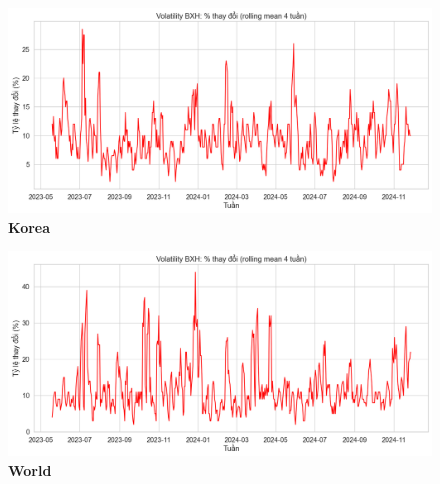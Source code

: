 \begin{itemize}
\begin{figure}[H]
        \begin{minipage}{0.45\textwidth}
            \centering
            \includegraphics[width=\linewidth]{../graphics/data_top50/figure/12/EDA_south_korea.png}
            \\[4pt] {\small \textbf{Korea}}
        \end{minipage}
        \hfill
        \begin{minipage}{0.45\textwidth}
            \centering
            \includegraphics[width=\linewidth]{../graphics/data_top50/figure/12/EDA_world.png}
            \\[4pt] {\small \textbf{World}}
        \end{minipage}




\end{figure}
\end{itemize}
